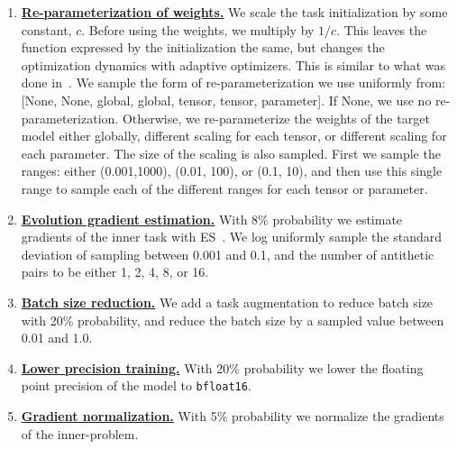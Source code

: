 \documentclass[11pt]{article}
\begin{document}
\begin{enumerate}
    \item \href{https://github.com/google/learned_optimization/blob/a42b207b9ef5395fdf7e64978c26379ccba4e264/learned_optimization/tasks/task_augmentation.py#L103}{\textbf{Re-parameterization of weights.}} We scale the task initialization by some constant, $c$. Before using the weights, we multiply by $1/c$. This leaves the function expressed by the initialization the same, but changes the optimization dynamics with adaptive optimizers.
    This is similar to what was done in~\citep{lv2017learning}.
    We sample the form of re-parameterization we use uniformly from: [None, None, global, global, tensor, tensor, parameter]. If None, we use no re-parameterization. Otherwise, we re-parameterize the weights of the target model either globally, different scaling for each tensor, or different scaling for each parameter.
    The size of the scaling is also sampled. First we sample the ranges: either (0.001,1000), (0.01, 100), or (0.1, 10), and then use this single range to sample each of the different ranges for each tensor or parameter.
    
    \item \href{https://github.com/google/learned_optimization/blob/a42b207b9ef5395fdf7e64978c26379ccba4e264/learned_optimization/tasks/es_wrapper.py#L227}{\textbf{Evolution gradient estimation.}} With 8\% probability we estimate gradients of the inner task with ES~\citep{salimans2017evolution}. We log uniformly sample the standard deviation of sampling between 0.001 and 0.1, and the number of antithetic pairs to be either 1, 2, 4, 8, or 16.
    
    \item \href{https://github.com/google/learned_optimization/blob/a42b207b9ef5395fdf7e64978c26379ccba4e264/learned_optimization/tasks/task_augmentation.py#L238}{\textbf{Batch size reduction.}} We add a task augmentation to reduce batch size with 20\% probability, and reduce the batch size by a sampled value between 0.01 and 1.0.
    
    \item \href{https://github.com/google/learned_optimization/blob/a42b207b9ef5395fdf7e64978c26379ccba4e264/learned_optimization/tasks/task_augmentation.py#L330}\textbf{{Lower precision training.}} With 20\% probability we lower the floating point precision of the model to \texttt{bfloat16}.
    
    \item \href{https://github.com/google/learned_optimization/blob/a42b207b9ef5395fdf7e64978c26379ccba4e264/learned_optimization/tasks/task_augmentation.py#L393}{\textbf{Gradient normalization.}} With 5\% probability we normalize the gradients of the inner-problem.
    

\end{enumerate}
\end{document}
